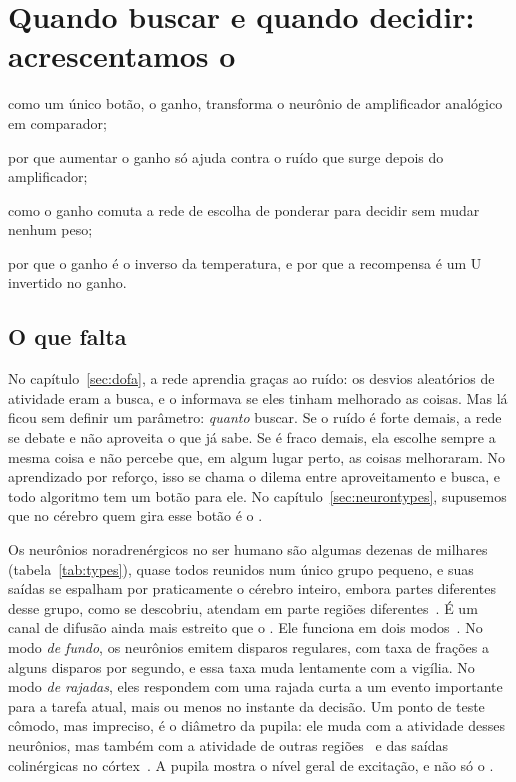 \chapter{Quando buscar e quando decidir: acrescentamos o }
\label{sec:nora}
\begin{chaptergoals}
\item como um único botão, o ganho, transforma o neurônio de amplificador analógico em comparador;
\item por que aumentar o ganho só ajuda contra o ruído que surge depois do amplificador;
\item como o ganho comuta a rede de escolha de ponderar para decidir sem mudar nenhum peso;
\item por que o ganho é o inverso da temperatura, e por que a recompensa é um U invertido no ganho.
\end{chaptergoals}

\section{O que falta}

No capítulo~\ref{sec:dofa}, a rede aprendia graças ao ruído: os desvios aleatórios de atividade eram a busca, e o  informava se eles tinham melhorado as coisas. Mas lá ficou sem definir um parâmetro: \emph{quanto} buscar. Se o ruído é forte demais, a rede se debate e não aproveita o que já sabe. Se é fraco demais, ela escolhe sempre a mesma coisa e não percebe que, em algum lugar perto, as coisas melhoraram. No aprendizado por reforço, isso se chama o dilema entre aproveitamento e busca, e todo algoritmo tem um botão para ele. No capítulo~\ref{sec:neurontypes}, supusemos que no cérebro quem gira esse botão é o .

Os neurônios noradrenérgicos no ser humano são algumas dezenas de milhares (tabela~\ref{tab:types}), quase todos reunidos num único grupo pequeno, e suas saídas se espalham por praticamente o cérebro inteiro, embora partes diferentes desse grupo, como se descobriu, atendam em parte regiões diferentes~\cite{Poe2020}. É um canal de difusão ainda mais estreito que o . Ele funciona em dois modos~\cite{AstonJones2005}. No modo \emph{de fundo}, os neurônios emitem disparos regulares, com taxa de frações a alguns disparos por segundo, e essa taxa muda lentamente com a vigília. No modo \emph{de rajadas}, eles respondem com uma rajada curta a um evento importante para a tarefa atual, mais ou menos no instante da decisão. Um ponto de teste cômodo, mas impreciso, é o diâmetro da pupila: ele muda com a atividade desses neurônios, mas também com a atividade de outras regiões~\cite{Joshi2016} e das saídas colinérgicas no córtex~\cite{Reimer2016}. A pupila mostra o nível geral de excitação, e não só o .

